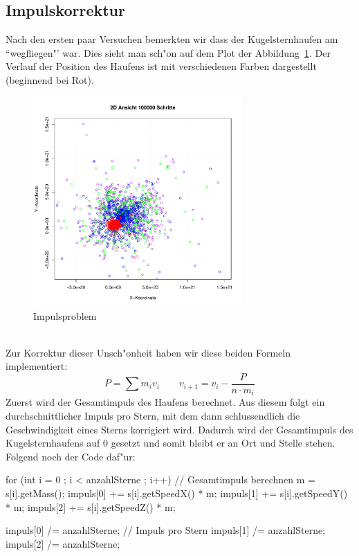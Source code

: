 \begin{refsection}
	\subsection{Impulskorrektur}
	Nach den ersten paar Versuchen bemerkten wir dass der Kugelsternhaufen am ``wegfliegen"' war. Dies sieht man sch"on auf dem Plot der Abbildung~\ref{Kugel.Impulsproblem}. Der Verlauf der Position des Haufens ist mit verschiedenen Farben dargestellt (beginnend bei Rot).
	\begin{figure}[h]
		\begin{center}
			\includegraphics[width = 8cm]{kugel/images/verschiebung.pdf}
		\end{center}
		\caption{Impulsproblem
		\label{Kugel.Impulsproblem}}
	\end{figure}\\
	Zur Korrektur dieser Unsch"onheit haben wir diese beiden Formeln implementiert:
	\begin{equation}
		 P = \sum m_i  v_i \qquad  v_{i+1} =  v_i - \dfrac{ P}{n \cdot m_i}
		\label{kugel:Formel:Korrektur}
	\end{equation}
	Zuerst wird der Gesamtimpuls des Haufens berechnet. Aus diesem folgt ein durchschnittlicher Impuls pro Stern, mit dem dann schlussendlich die Geschwindigkeit eines Sterns korrigiert wird. Dadurch wird der Gesamtimpuls des Kugelsternhaufens auf 0 gesetzt und somit bleibt er an Ort und Stelle stehen. Folgend noch der Code daf"ur:
\begin{Cpp}
for (int i = 0 ; i < anzahlSterne ; i++){	// Gesamtimpuls berechnen
	m = s[i].getMass();
	impuls[0] += s[i].getSpeedX() * m;
	impuls[1] += s[i].getSpeedY() * m;
	impuls[2] += s[i].getSpeedZ() * m;
}
  
impuls[0] /= anzahlSterne;					// Impuls pro Stern
impuls[1] /= anzahlSterne;
impuls[2] /= anzahlSterne;


\end{Cpp}
\end{refsection}
